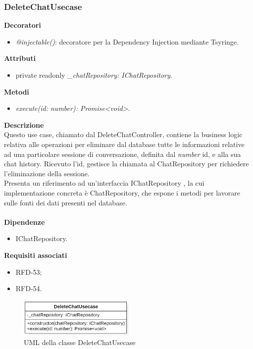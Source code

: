 \subsubsection{DeleteChatUsecase}
\textbf{Decoratori}
\begin{itemize}
    \item \textit{@injectable()}: decoratore per la Dependency Injection mediante Tsyringe.
\end{itemize}
\textbf{Attributi}
\begin{itemize}
    \item private readonly \textit{\_chatRepository: IChatRepository}.
\end{itemize}
\textbf{Metodi}
\begin{itemize}
    \item \textit{execute(id: number): Promise<void>}.
\end{itemize}
\textbf{Descrizione}\\
Questo use case, chiamato dal DeleteChatController, contiene la business logic relativa alle operazioni per eliminare dal database tutte le informazioni relative ad una particolare sessione di conversazione, definita dal \textit{number} id, e alla sua chat history. Ricevuto l'id, gestisce la chiamata al ChatRepository per richiedere l'eliminazione della sessione.\\
Presenta un riferimento ad un'interfaccia IChatRepository , la cui implementazione concreta è ChatRepository, che espone i metodi per lavorare sulle fonti dei dati presenti nel database.\\ \\
\textbf{Dipendenze}
\begin{itemize}
    \item IChatRepository.
\end{itemize}
\textbf{Requisiti associati}
\begin{itemize}[itemsep=-4pt]
    \item RFD-53;
    \item RFD-54.
\end{itemize}

\begin{figure}[h!]
    \centering  
    \includegraphics[width=0.5\textwidth]{DeleteChatUsecase.png}
    \caption{UML della classe DeleteChatUsecase}
\end{figure}

